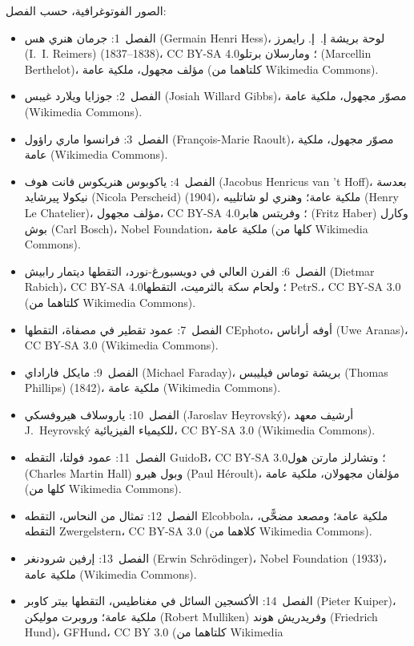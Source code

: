 \bigskip
\noindent الصور الفوتوغرافية، حسب الفصل:
\begin{itemize}\small
  \item الفصل~1: جرمان هنري هس (Germain Henri Hess)، لوحة بريشة إ.~إ. رايمرز (I.~I. Reimers)
        (1837--1838)، CC BY-SA 4.0؛ ومارسلان برتلو (Marcellin Berthelot)، مؤلف مجهول، ملكية عامة
        (كلتاهما من Wikimedia Commons).
  \item الفصل~2: جوزايا ويلارد غيبس (Josiah Willard Gibbs)، مصوّر مجهول، ملكية عامة
        (Wikimedia Commons).
  \item الفصل~3: فرانسوا ماري راؤول (François-Marie Raoult)، مصوّر مجهول، ملكية عامة
        (Wikimedia Commons).
  \item الفصل~4: ياكوبوس هنريكوس فانت هوف (Jacobus Henricus van 't Hoff)، بعدسة نيكولا پيرشايد
        (Nicola Perscheid) (1904)، ملكية عامة؛ وهنري لو شاتلييه (Henry Le Chatelier)، مؤلف مجهول،
        CC BY-SA 4.0؛ وفريتس هابر (Fritz Haber) وكارل بوش (Carl Bosch)، Nobel Foundation، ملكية عامة
        (كلها من Wikimedia Commons).
  \item الفصل~6: الفرن العالي في دويسبورغ-نورد، التقطها ديتمار رابيش (Dietmar Rabich)، CC BY-SA
        4.0؛ ولحام سكة بالثرميت، التقطها PetrS.، CC BY-SA 3.0 (كلتاهما من
        Wikimedia Commons).
  \item الفصل~7: عمود تقطير في مصفاة، التقطها CEphoto، أوفه أراناس (Uwe Aranas)،
        CC BY-SA 3.0 (Wikimedia Commons).
  \item الفصل~9: مايكل فاراداي (Michael Faraday)، بريشة توماس فيليبس (Thomas Phillips) (1842)، ملكية عامة
        (Wikimedia Commons).
  \item الفصل~10: ياروسلاف هيروفسكي (Jaroslav Heyrovsk\'y)، أرشيف معهد J.~Heyrovsk\'y
        للكيمياء الفيزيائية، CC BY-SA 3.0 (Wikimedia Commons).
  \item الفصل~11: عمود فولتا، التقطه GuidoB، CC BY-SA 3.0؛ وتشارلز مارتن هول (Charles Martin Hall)
        وبول هيرو (Paul H\'eroult)، مؤلفان مجهولان، ملكية عامة (كلها من Wikimedia
        Commons).
  \item الفصل~12: تمثال من النحاس، التقطه Elcobbola، ملكية عامة؛ ومصعد مضحًّى،
        التقطه Zwergelstern، CC BY-SA 3.0 (كلاهما من Wikimedia Commons).
  \item الفصل~13: إرفين شرودنغر (Erwin Schr\"odinger)، Nobel Foundation (1933)، ملكية عامة
        (Wikimedia Commons).
  \item الفصل~14: الأكسجين السائل في مغناطيس، التقطها بيتر كاوبر (Pieter Kuiper)، ملكية عامة؛
        وروبرت موليكن (Robert Mulliken) وفريدريش هوند (Friedrich Hund)، GFHund، CC BY 3.0 (كلتاهما من Wikimedia

\end{itemize}
